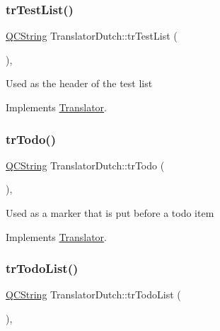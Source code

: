 \subsubsection{\texorpdfstring{trTestList()}{trTestList()}}
{\footnotesize\ttfamily \mbox{\hyperlink{class_q_c_string}{Q\+C\+String}} Translator\+Dutch\+::tr\+Test\+List (\begin{DoxyParamCaption}{ }\end{DoxyParamCaption})\hspace{0.3cm}{\ttfamily [inline]}, {\ttfamily [virtual]}}

Used as the header of the test list 

Implements \mbox{\hyperlink{class_translator}{Translator}}.

\mbox{\label{class_translator_dutch_acc70d3be78227dc0f43d385478bd1d15}} 
\subsubsection{\texorpdfstring{trTodo()}{trTodo()}}
{\footnotesize\ttfamily \mbox{\hyperlink{class_q_c_string}{Q\+C\+String}} Translator\+Dutch\+::tr\+Todo (\begin{DoxyParamCaption}{ }\end{DoxyParamCaption})\hspace{0.3cm}{\ttfamily [inline]}, {\ttfamily [virtual]}}

Used as a marker that is put before a todo item 

Implements \mbox{\hyperlink{class_translator}{Translator}}.

\mbox{\label{class_translator_dutch_ad327b25b8913ea5261090f41c131f52f}} 
\subsubsection{\texorpdfstring{trTodoList()}{trTodoList()}}
{\footnotesize\ttfamily \mbox{\hyperlink{class_q_c_string}{Q\+C\+String}} Translator\+Dutch\+::tr\+Todo\+List (\begin{DoxyParamCaption}{ }\end{DoxyParamCaption})\hspace{0.3cm}{\ttfamily [inline]}, {\ttfamily [virtual]}}

